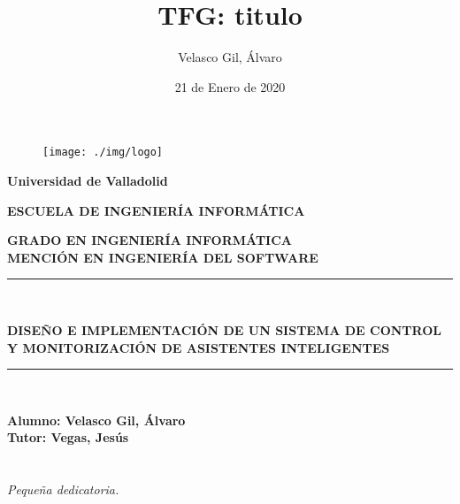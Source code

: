 \documentclass[openright,twoside,10pt]{book}
\date{21 de Enero de 2020}
\author{Velasco Gil, Álvaro}
\title{TFG: titulo}
\begin{document}
\begin{titlepage}

\begin{center}
\vspace*{-1in}
\begin{figure}[htb]
\begin{center}
\texttt{[image: ./img/logo]}
\end{center}
\end{figure}
\begin{large}
\textbf{Universidad de Valladolid}
\end{large}

\vspace*{0.15in}

\vspace*{0.6in}
\begin{large}
\textbf{ESCUELA DE INGENIERÍA INFORMÁTICA}

\end{large}
\vspace*{0.2in}
\textbf{ GRADO EN INGENIERÍA INFORMÁTICA}\\
\textbf{ MENCIÓN EN INGENIERÍA DEL SOFTWARE }
\vspace*{0.1in}
\rule{140mm}{0.1mm}\\
\vspace*{0.2in}
\begin{large}
\textbf{{\LARGE DISEÑO E IMPLEMENTACIÓN DE UN SISTEMA DE CONTROL Y MONITORIZACIÓN DE ASISTENTES INTELIGENTES\\}}
\end{large}
\vspace*{0.2in}
\rule{140mm}{0.1mm}\\
\vspace*{2in}
\begin{large}
\begin{flushright}
\textbf{Alumno: Velasco Gil, Álvaro \\
\vspace*{0.3in}
Tutor: Vegas, Jesús }
\end{flushright}
\end{large}
\end{center}

\end{titlepage}

\newpage
\mbox{}	
\thispagestyle{empty} %

\chapter*{}
\begin{flushright}
\textit{%
Pequeña dedicatoria.}
\end{flushright}
\end{document}
